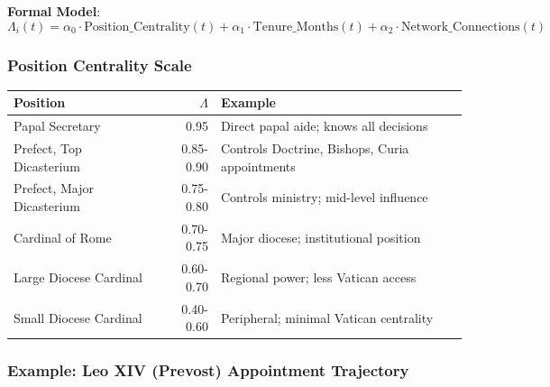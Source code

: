 \documentclass[11pt]{article}
\begin{document}
\textbf{Formal Model}:
\begin{equation}
\Lambda_i(t) = \alpha_0 \cdot \text{Position\_Centrality}(t) + \alpha_1 \cdot \text{Tenure\_Months}(t) + \alpha_2 \cdot \text{Network\_Connections}(t)
\end{equation}

\subsubsection{Position Centrality Scale}

\begin{table}[h]
\centering
\begin{tabular}{|l|r|l|}
\hline
\textbf{Position} & $\Lambda$ & \textbf{Example} \\
\hline
Papal Secretary & 0.95 & Direct papal aide; knows all decisions \\
Prefect, Top Dicasterium & 0.85-0.90 & Controls Doctrine, Bishops, Curia appointments \\
Prefect, Major Dicasterium & 0.75-0.80 & Controls ministry; mid-level influence \\
Cardinal of Rome & 0.70-0.75 & Major diocese; institutional position \\
Large Diocese Cardinal & 0.60-0.70 & Regional power; less Vatican access \\
Small Diocese Cardinal & 0.40-0.60 & Peripheral; minimal Vatican centrality \\
\hline
\end{tabular}
\end{table}

\subsubsection{Example: Leo XIV (Prevost) Appointment Trajectory}
\end{document}

